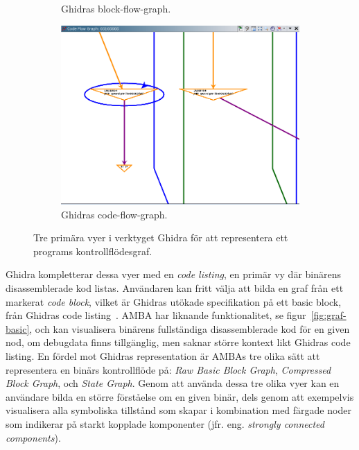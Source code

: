 \begin{figure}[H]
\begin{subfigure}{0.3\textwidth}
        \caption{Ghidras block-flow-graph.}
        \label{fig:ghidra_block_graph}
    \end{subfigure}
    \hspace*{\fill}
    \begin{subfigure}{0.3\textwidth}
        \includegraphics[width=\linewidth]{figures/ghidra_code_flow.png}
        \caption{Ghidras code-flow-graph.} \label{fig:ghidra_code_flow_graph}
    \end{subfigure}

    \caption{Tre primära vyer i verktyget Ghidra för att representera ett programs
        kontrollflödesgraf.} \label{fig:ghidra_figures}
\end{figure}

Ghidra kompletterar dessa vyer med en \textit{code listing}, en primär vy där
binärens disassemblerade kod listas. Användaren kan fritt välja att bilda en
graf från ett markerat \textit{code block}, vilket är Ghidras utökade
specifikation på ett basic block, från Ghidras code
listing~\cite{ghidra_website}. AMBA har liknande funktionalitet, se
figur~\ref{fig:graf-basic}, och kan visualisera binärens fullständiga
disassemblerade kod för en given nod, om debugdata finns tillgänglig, men saknar
större kontext likt Ghidras code listing. En fördel mot Ghidras representation
är AMBAs tre olika sätt att representera en binärs kontrollflöde på: \textit{Raw
    Basic Block Graph}, \textit{Compressed Block Graph}, och \textit{State Graph}.
Genom att använda dessa tre olika vyer kan en användare bilda en större
förståelse om en given binär, dels genom att exempelvis visualisera alla
symboliska tillstånd som \stoe{} skapar i kombination med färgade noder som
indikerar på starkt kopplade komponenter (jfr. eng. \emph{strongly connected
    components}).

